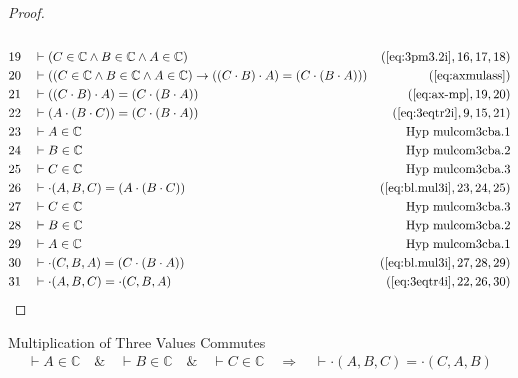\begin{proof}
\begin{align}
  \\ 19 &&  & \vdash ( C \in \mathbb{C} \wedge B \in \mathbb{C} \wedge A \in \mathbb{C} )&(\mbox{\ref{eq:3pm3.2i}},16,17,18)\notag
  \\ 20 &&  & \vdash ( ( C \in \mathbb{C} \wedge B \in \mathbb{C} \wedge A \in \mathbb{C} ) \rightarrow ( ( C \cdot B ) \cdot A ) = ( C \cdot ( B \cdot A ) ) )&(\mbox{\ref{eq:axmulass}})\notag
  \\ 21 &&  & \vdash ( ( C \cdot B ) \cdot A ) = ( C \cdot ( B \cdot A ) )&(\mbox{\ref{eq:ax-mp}},19,20)\notag
  \\ 22 &&  & \vdash ( A \cdot ( B \cdot C ) ) = ( C \cdot ( B \cdot A ) )&(\mbox{\ref{eq:3eqtr2i}},9,15,21)\notag
  \\ 23 &&  & \vdash A \in
\mathbb{C}&\text{Hyp~mulcom3cba.1}\notag%
  \\ 24 &&  & \vdash B \in
\mathbb{C}&\text{Hyp~mulcom3cba.2}\notag%
  \\ 25 &&  & \vdash C \in
\mathbb{C}&\text{Hyp~mulcom3cba.3}\notag%
  \\ 26 &&  & \vdash \cdot( A , B , C ) = ( A \cdot ( B \cdot C ) )&(\mbox{\ref{eq:bl.mul3i}},23,24,25)\notag
  \\ 27 &&  & \vdash C \in
\mathbb{C}&\text{Hyp~mulcom3cba.3}\notag%
  \\ 28 &&  & \vdash B \in
\mathbb{C}&\text{Hyp~mulcom3cba.2}\notag%
  \\ 29 &&  & \vdash A \in
\mathbb{C}&\text{Hyp~mulcom3cba.1}\notag%
  \\ 30 &&  & \vdash \cdot( C , B , A ) = ( C \cdot ( B \cdot A ) )&(\mbox{\ref{eq:bl.mul3i}},27,28,29)\notag
  \\ 31 &&  & \vdash \cdot( A , B , C ) = \cdot( C , B , A )&(\mbox{\ref{eq:3eqtr4i}},22,26,30)\notag
\end{align}
\end{proof}

\begin{lemma} Multiplication of Three Values
Commutes
\begin{align}
\vdash A \in \mathbb{C}\quad\&\quad \vdash B \in \mathbb{C}\quad\&\quad \vdash
    C \in \mathbb{C}\quad\Rightarrow\quad \vdash \cdot( A , B , C ) = \cdot( C
    , A , B )\label{eq:bl.mulcom3cab}\tag{bl.mulcom3cab}
\end{align}
\end{lemma}

